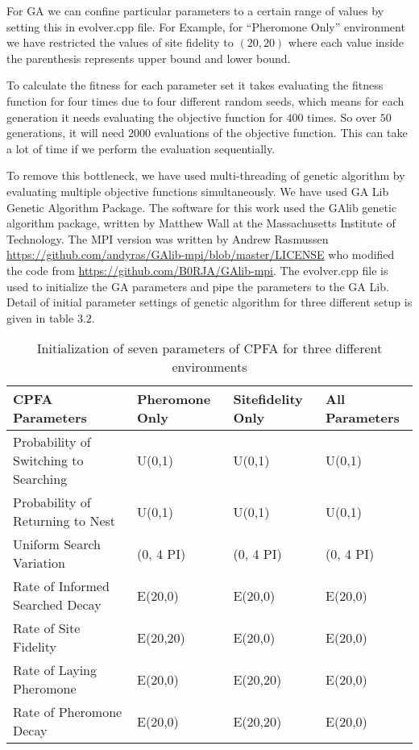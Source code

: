 For GA we can confine particular parameters to a certain range of values by setting this in evolver.cpp file. For Example, for ``Pheromone Only'' environment we have restricted the values of site fidelity to $(20,20)$ where each value inside the parenthesis represents upper bound and lower bound.\par 
To calculate the fitness for each parameter set it takes evaluating the fitness function for four times due to four different random seeds, which means for each generation it needs evaluating the objective function for $400$ times. So over $50$ generations, it will need $2000$ evaluations of the objective function. This can take a lot of time if we perform the evaluation sequentially.\par 
To remove this bottleneck, we have used multi-threading of genetic algorithm by evaluating multiple objective functions simultaneously. We have used GA Lib Genetic Algorithm Package. The software for this work used the GAlib genetic algorithm package, written by Matthew Wall at the Massachusetts Institute of Technology. The MPI version was written by Andrew Rasmussen \url{https://github.com/andyras/GAlib-mpi/blob/master/LICENSE} who modified the code from \url{https://github.com/B0RJA/GAlib-mpi}.
The evolver.cpp file is used to initialize the GA parameters and pipe the parameters to the GA Lib.
Detail of initial parameter settings of genetic algorithm for three different setup is given in table $3.2$.
\begin{table}[h]
	\begin{tabular}{ |p{}|p{}|p{}|p{}| } 
		\hline
		\textbf{CPFA Parameters} & \textbf{Pheromone Only} & \textbf{Sitefidelity Only} & \textbf{All Parameters} \\
		\hline 
		Probability of Switching to Searching & U(0,1) & U(0,1) & U(0,1)\\ 
		\hline
		Probability of Returning to Nest & U(0,1) & U(0,1) & U(0,1)\\ 
		\hline
		Uniform Search Variation & (0, 4 PI) & (0, 4 PI) & (0, 4 PI)\\
		\hline
		Rate of Informed Searched Decay & E(20,0) & E(20,0) & E(20,0)\\
		\hline
		Rate of Site Fidelity & E(20,20) & E(20,0) & E(20,0)\\
		\hline
		Rate of Laying Pheromone & E(20,0) & E(20,20) & E(20,0)\\
		\hline
		Rate of Pheromone Decay & E(20,0) & E(20,20) & E(20,0)\\
		\hline
	\end{tabular}
	\caption{Initialization of seven parameters of CPFA for three different environments}
\end{table}
